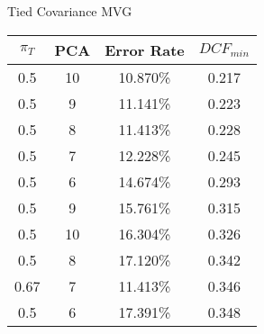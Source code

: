 \caption{Tied Covariance MVG}\label{tab:mvg_tiedcov}
\begin{center}
\begin{tabular}{|c|c|c|c|}
\hline
$\pi_T$ & PCA & Error Rate & $DCF_{min}$\\
\hline
0.5 & 10 & 10.870\% & 0.217\\
\hline
0.5 & 9 & 11.141\% & 0.223\\
\hline
0.5 & 8 & 11.413\% & 0.228\\
\hline
0.5 & 7 & 12.228\% & 0.245\\
\hline
0.5 & 6 & 14.674\% & 0.293\\
\hline
0.5 & 9 & 15.761\% & 0.315\\
\hline
0.5 & 10 & 16.304\% & 0.326\\
\hline
0.5 & 8 & 17.120\% & 0.342\\
\hline
0.67 & 7 & 11.413\% & 0.346\\
\hline
0.5 & 6 & 17.391\% & 0.348\\
\hline
\end{tabular}
\end{center}
